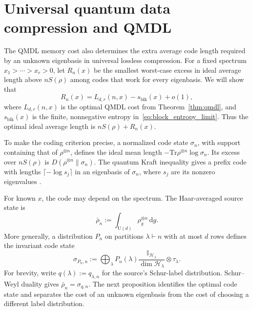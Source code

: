 \documentclass[a4paper,onecolumn,11pt]{quantumarticle}
\newcommand{\dd}{\mathrm{d}}
\def\h{\mathcal{H}}
\def\id{\mathbb{I}}
\newcommand*{\Tr}{\mathrm{Tr}}
\begin{document}
\section{Universal quantum data compression and QMDL}\label{sec:redundancy}

The QMDL memory cost also determines the extra average code length
required by an unknown eigenbasis in universal lossless compression.
For a fixed spectrum $x_1>\cdots>x_r>0$, let $R_n(x)$ be the smallest
worst-case excess in ideal average length above $nS(\rho)$ among
codes that work for every eigenbasis. We will show that
\begin{equation}\label{eq:orbit_redundancy}
R_n(x)=L_{d,r}(n,x)-s_{\mathrm{blk}}(x)+o(1),
\end{equation}
where $L_{d,r}(n,x)$ is the optimal QMDL cost from
Theorem~\ref{thm:qmdl}, and $s_{\mathrm{blk}}(x)$ is the finite,
nonnegative entropy in~\eqref{eq:block_entropy_limit}. Thus the
optimal ideal average length is $nS(\rho)+R_n(x)$.

To make the coding criterion precise, a normalized code state
$\sigma_n$, with support containing that of
$\rho^{\otimes n}$, defines the ideal mean length
$-\Tr\rho^{\otimes n}\log\sigma_n$. Its excess over $nS(\rho)$ is
$D(\rho^{\otimes n}\|\sigma_n)$. The quantum Kraft inequality gives a
prefix code with lengths $\lceil-\log s_j\rceil$ in an eigenbasis of
$\sigma_n$, where $s_j$ are its nonzero eigenvalues
\cite{schumacher2001indeterminate,bostroem2002lossless,hayashi2010universal}.

For known $x$, the code may depend on the spectrum. The
Haar-averaged source state is
\[
\bar\rho_n:=\int_{\mathrm U(d)}\rho_g^{\otimes n}\,\dd g.
\]
More generally, a distribution $P_n$ on partitions $\lambda\vdash n$
with at most $d$ rows defines the invariant code state
\[
\sigma_{P_n,n}:=\bigoplus_\lambda P_n(\lambda)
\frac{\id_{\h_\lambda}}{\dim\h_\lambda}\otimes\tau_\lambda.
\]
For brevity, write $q(\lambda):=q_{\lambda,n}$ for the source's
Schur-label distribution. Schur--Weyl duality gives
$\bar\rho_n=\sigma_{q,n}$.
The next proposition identifies the optimal code state and
separates the cost of an unknown eigenbasis from the cost of
choosing a different label distribution.
\end{document}
